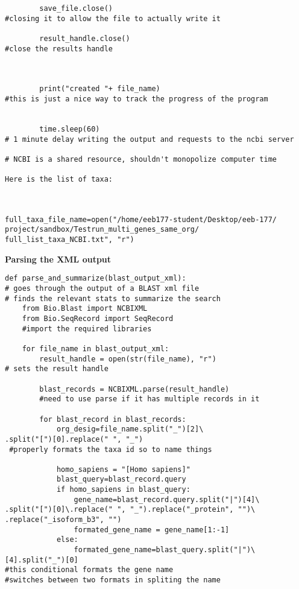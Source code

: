\documentclass[12pt]{article}
\begin{document}
\begin{lstlisting}
        save_file.close() 
#closing it to allow the file to actually write it

        result_handle.close() 
#close the results handle

        

        print("created "+ file_name) 
#this is just a nice way to track the progress of the program
        

        time.sleep(60)  
# 1 minute delay writing the output and requests to the ncbi server

# NCBI is a shared resource, shouldn't monopolize computer time

Here is the list of taxa:



full_taxa_file_name=open("/home/eeb177-student/Desktop/eeb-177/
project/sandbox/Testrun_multi_genes_same_org/
full_list_taxa_NCBI.txt", "r")

\end{lstlisting}



\textbf{Parsing the XML output}

\begin{lstlisting}
def parse_and_summarize(blast_output_xml):
# goes through the output of a BLAST xml file 
# finds the relevant stats to summarize the search
    from Bio.Blast import NCBIXML
    from Bio.SeqRecord import SeqRecord
    #import the required libraries
    
    for file_name in blast_output_xml:
        result_handle = open(str(file_name), "r") 
# sets the result handle
        
        blast_records = NCBIXML.parse(result_handle)
        #need to use parse if it has multiple records in it
        
        for blast_record in blast_records:
            org_desig=file_name.split("_")[2]\
.split("[")[0].replace(" ", "_")
 #properly formats the taxa id so to name things
            
            homo_sapiens = "[Homo sapiens]"
            blast_query=blast_record.query
            if homo_sapiens in blast_query:
                gene_name=blast_record.query.split("|")[4]\
.split("[")[0]\.replace(" ", "_").replace("_protein", "")\
.replace("_isoform_b3", "")
                formated_gene_name = gene_name[1:-1]
            else:
                formated_gene_name=blast_query.split("|")\
[4].split("_")[0]
#this conditional formats the gene name 
#switches between two formats in spliting the name

\end{lstlisting}
\end{document}
